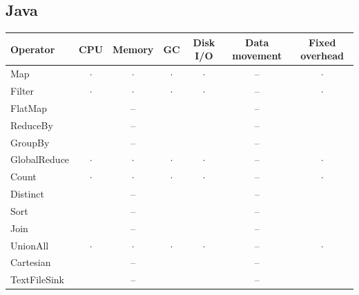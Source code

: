 \documentclass[11pt,a4paper]{article}
\providecommand{\high}{\CIRCLE}\providecommand{\some}{\LEFTcircle}\providecommand{\low}{\Circle}
\begin{document}
\subsection{Java}
\begin{center}\small\begin{tabular}{lcccccc}\toprule

Operator & CPU & Memory & GC & Disk I/O & Data movement & Fixed overhead\\\midrule

Map & $\cdot$ & $\cdot$ & $\cdot$ & $\cdot$ & -- & $\cdot$\\

Filter & $\cdot$ & $\cdot$ & $\cdot$ & $\cdot$ & -- & $\cdot$\\

FlatMap & \high & -- & \low & \low & -- & \low\\

ReduceBy & \high & -- & \low & \low & -- & \low\\

GroupBy & \high & -- & \low & \low & -- & \low\\

GlobalReduce & $\cdot$ & $\cdot$ & $\cdot$ & $\cdot$ & -- & $\cdot$\\

Count & $\cdot$ & $\cdot$ & $\cdot$ & $\cdot$ & -- & $\cdot$\\

Distinct & \some & -- & \low & \low & -- & \low\\

Sort & \high & -- & \low & \low & -- & \low\\

Join & \high & -- & \low & \low & -- & \low\\

UnionAll & $\cdot$ & $\cdot$ & $\cdot$ & $\cdot$ & -- & $\cdot$\\

Cartesian & \high & -- & \low & \low & -- & \low\\

TextFileSink & \high & -- & \low & \high & -- & \some\\
\bottomrule\end{tabular}\end{center}
\end{document}
